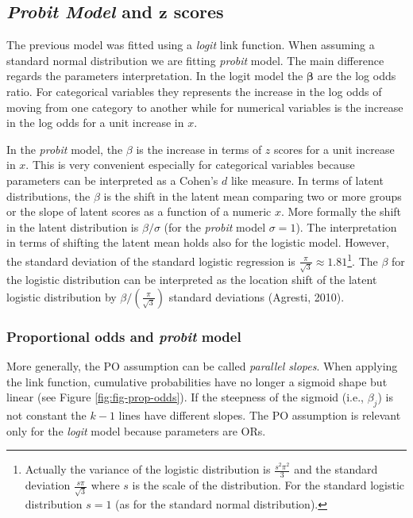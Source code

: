 \documentclass[
  man,floatsintext]{apa6}
\begin{document}
\normalsize

\subsection{\texorpdfstring{\emph{Probit Model} and \(\mathbf{z}\) scores}{Probit Model and \textbackslash mathbf\{z\} scores}}\label{probit-model-and-mathbfz-scores}

The previous model was fitted using a \emph{logit} link function. When assuming a standard normal distribution we are fitting \emph{probit} model. The main difference regards the parameters interpretation. In the logit model the \(\boldsymbol{\beta}\) are the log odds ratio. For categorical variables they represents the increase in the log odds of moving from one category to another while for numerical variables is the increase in the log odds for a unit increase in \(x\).

In the \emph{probit} model, the \(\beta\) is the increase in terms of \(z\) scores for a unit increase in \(x\). This is very convenient especially for categorical variables because parameters can be interpreted as a Cohen's \(d\) like measure. In terms of latent distributions, the \(\beta\) is the shift in the latent mean comparing two or more groups or the slope of latent scores as a function of a numeric \(x\). More formally the shift in the latent distribution is \(\beta/\sigma\) (for the \emph{probit} model \(\sigma = 1\)). The interpretation in terms of shifting the latent mean holds also for the logistic model. However, the standard deviation of the standard logistic regression is \(\frac{\pi}{\sqrt{3}} \approx 1.81\)\footnote{Actually the variance of the logistic distribution is \(\frac{s^2\pi^2}{3}\) and the standard deviation \(\frac{s\pi}{\sqrt{3}}\) where \(s\) is the scale of the distribution. For the standard logistic distribution \(s = 1\) (as for the standard normal distribution).}. The \(\beta\) for the logistic distribution can be interpreted as the location shift of the latent logistic distribution by \(\beta/(\frac{\pi}{\sqrt{3}})\) standard deviations (Agresti, 2010).

\subsubsection{\texorpdfstring{Proportional odds and \emph{probit} model}{Proportional odds and probit model}}\label{proportional-odds-and-probit-model}

More generally, the PO assumption can be called \emph{parallel slopes}. When applying the link function, cumulative probabilities have no longer a sigmoid shape but linear (see Figure \ref{fig:fig-prop-odds}). If the steepness of the sigmoid (i.e., \(\beta_j\)) is not constant the \(k - 1\) lines have different slopes. The PO assumption is relevant only for the \emph{logit} model because parameters are ORs.
\end{document}
